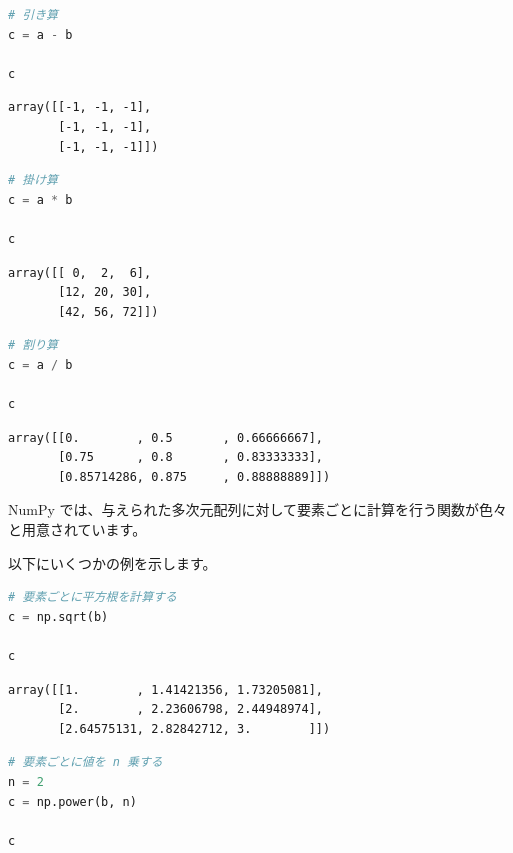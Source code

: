 \begin{lstlisting}[style=codecell,language=Python]
# 引き算
c = a - b

c
\end{lstlisting}

\begin{lstlisting}[style=outputcell]
array([[-1, -1, -1],
       [-1, -1, -1],
       [-1, -1, -1]])
\end{lstlisting}

\begin{lstlisting}[style=codecell,language=Python]
# 掛け算
c = a * b

c
\end{lstlisting}

\begin{lstlisting}[style=outputcell]
array([[ 0,  2,  6],
       [12, 20, 30],
       [42, 56, 72]])
\end{lstlisting}

\begin{lstlisting}[style=codecell,language=Python]
# 割り算
c = a / b

c
\end{lstlisting}

\begin{lstlisting}[style=outputcell]
array([[0.        , 0.5       , 0.66666667],
       [0.75      , 0.8       , 0.83333333],
       [0.85714286, 0.875     , 0.88888889]])
\end{lstlisting}

NumPy では、与えられた多次元配列に対して要素ごとに計算を行う関数が色々と用意されています。

以下にいくつかの例を示します。


\begin{lstlisting}[style=codecell,language=Python]
# 要素ごとに平方根を計算する
c = np.sqrt(b)

c
\end{lstlisting}

\begin{lstlisting}[style=outputcell]
array([[1.        , 1.41421356, 1.73205081],
       [2.        , 2.23606798, 2.44948974],
       [2.64575131, 2.82842712, 3.        ]])
\end{lstlisting}

\begin{lstlisting}[style=codecell,language=Python]
# 要素ごとに値を n 乗する
n = 2
c = np.power(b, n)

c
\end{lstlisting}

